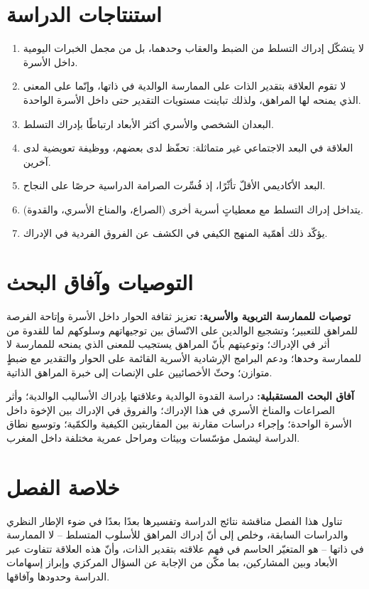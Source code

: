 \section{استنتاجات الدراسة}
\begin{enumerate}[leftmargin=2em,itemsep=1pt]
\item لا يتشكّل إدراك التسلط من الضبط والعقاب وحدهما، بل من مجمل الخبرات اليومية داخل الأسرة.
\item لا تقوم العلاقة بتقدير الذات على الممارسة الوالدية في ذاتها، وإنّما على المعنى الذي يمنحه
لها المراهق، ولذلك تباينت مستويات التقدير حتى داخل الأسرة الواحدة.
\item البعدان الشخصي والأسري أكثر الأبعاد ارتباطًا بإدراك التسلط.
\item العلاقة في البعد الاجتماعي غير متماثلة: تحفّظ لدى بعضهم، ووظيفة تعويضية لدى آخرين.
\item البعد الأكاديمي الأقلّ تأثّرًا، إذ فُسِّرت الصرامة الدراسية حرصًا على النجاح.
\item يتداخل إدراك التسلط مع معطياتٍ أسرية أخرى (الصراع، والمناخ الأسري، والقدوة).
\item يؤكّد ذلك أهمّية المنهج الكيفي في الكشف عن الفروق الفردية في الإدراك.
\end{enumerate}

\section{التوصيات وآفاق البحث}
\noindent\textbf{توصيات للممارسة التربوية والأسرية:} تعزيز ثقافة الحوار داخل الأسرة وإتاحة
الفرصة للمراهق للتعبير؛ وتشجيع الوالدين على الاتّساق بين توجيهاتهم وسلوكهم لما للقدوة من أثر في
الإدراك؛ وتوعيتهم بأنّ المراهق يستجيب للمعنى الذي يمنحه للممارسة لا للممارسة وحدها؛ ودعم البرامج
الإرشادية الأسرية القائمة على الحوار والتقدير مع ضبطٍ متوازن؛ وحثّ الأخصائيين على الإنصات إلى
خبرة المراهق الذاتية.\par
\noindent\textbf{آفاق البحث المستقبلية:} دراسة القدوة الوالدية وعلاقتها بإدراك الأساليب الوالدية؛
وأثر الصراعات والمناخ الأسري في هذا الإدراك؛ والفروق في الإدراك بين الإخوة داخل الأسرة الواحدة؛
وإجراء دراسات مقارنة بين المقاربتين الكيفية والكمّية؛ وتوسيع نطاق الدراسة ليشمل مؤسّسات وبيئات
ومراحل عمرية مختلفة داخل المغرب.

\section*{خلاصة الفصل}
تناول هذا الفصل مناقشة نتائج الدراسة وتفسيرها بعدًا بعدًا في ضوء الإطار النظري والدراسات السابقة،
وخلص إلى أنّ إدراك المراهق للأسلوب المتسلط -- لا الممارسة في ذاتها -- هو المتغيّر الحاسم في فهم
علاقته بتقدير الذات، وأنّ هذه العلاقة تتفاوت عبر الأبعاد وبين المشاركين، بما مكّن من الإجابة عن
السؤال المركزي وإبراز إسهامات الدراسة وحدودها وآفاقها.
